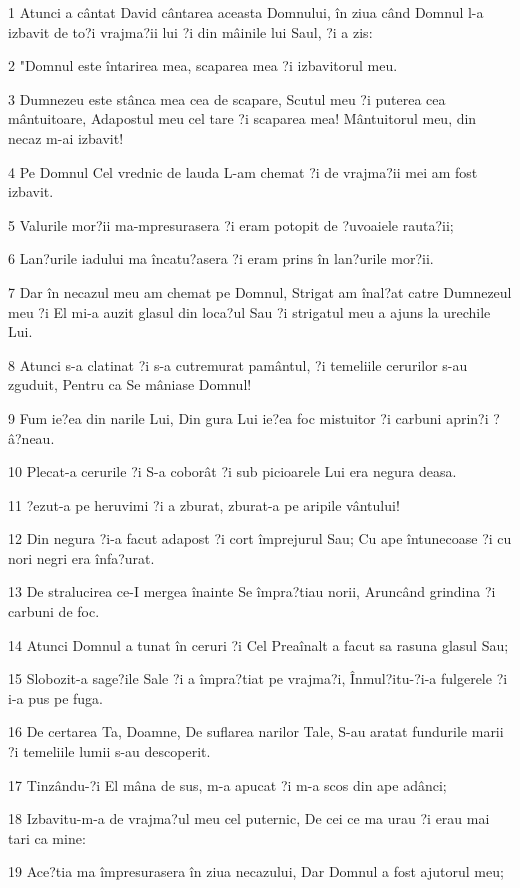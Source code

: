 \par 1 Atunci a cântat David cântarea aceasta Domnului, în ziua când Domnul l-a izbavit de to?i vrajma?ii lui ?i din mâinile lui Saul, ?i a zis:
\par 2 "Domnul este întarirea mea, scaparea mea ?i izbavitorul meu.
\par 3 Dumnezeu este stânca mea cea de scapare, Scutul meu ?i puterea cea mântuitoare, Adapostul meu cel tare ?i scaparea mea! Mântuitorul meu, din necaz m-ai izbavit!
\par 4 Pe Domnul Cel vrednic de lauda L-am chemat ?i de vrajma?ii mei am fost izbavit.
\par 5 Valurile mor?ii ma-mpresurasera ?i eram potopit de ?uvoaiele rauta?ii;
\par 6 Lan?urile iadului ma încatu?asera ?i eram prins în lan?urile mor?ii.
\par 7 Dar în necazul meu am chemat pe Domnul, Strigat am înal?at catre Dumnezeul meu ?i El mi-a auzit glasul din loca?ul Sau ?i strigatul meu a ajuns la urechile Lui.
\par 8 Atunci s-a clatinat ?i s-a cutremurat pamântul, ?i temeliile cerurilor s-au zguduit, Pentru ca Se mâniase Domnul!
\par 9 Fum ie?ea din narile Lui, Din gura Lui ie?ea foc mistuitor ?i carbuni aprin?i ?â?neau.
\par 10 Plecat-a cerurile ?i S-a coborât ?i sub picioarele Lui era negura deasa.
\par 11 ?ezut-a pe heruvimi ?i a zburat, zburat-a pe aripile vântului!
\par 12 Din negura ?i-a facut adapost ?i cort împrejurul Sau; Cu ape întunecoase ?i cu nori negri era înfa?urat.
\par 13 De stralucirea ce-I mergea înainte Se împra?tiau norii, Aruncând grindina ?i carbuni de foc.
\par 14 Atunci Domnul a tunat în ceruri ?i Cel Preaînalt a facut sa rasuna glasul Sau;
\par 15 Slobozit-a sage?ile Sale ?i a împra?tiat pe vrajma?i, Înmul?itu-?i-a fulgerele ?i i-a pus pe fuga.
\par 16 De certarea Ta, Doamne, De suflarea narilor Tale, S-au aratat fundurile marii ?i temeliile lumii s-au descoperit.
\par 17 Tinzându-?i El mâna de sus, m-a apucat ?i m-a scos din ape adânci;
\par 18 Izbavitu-m-a de vrajma?ul meu cel puternic, De cei ce ma urau ?i erau mai tari ca mine:
\par 19 Ace?tia ma împresurasera în ziua necazului, Dar Domnul a fost ajutorul meu;
